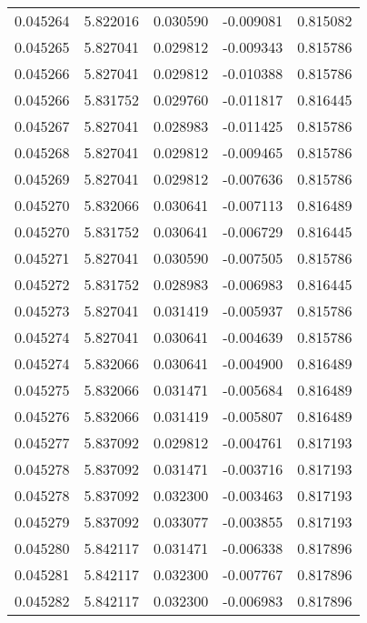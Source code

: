 \begin{tabular}{lrrrr}
0.045264    &  5.822016 &  0.030590 & -0.009081 &             0.815082 \\
0.045265    &  5.827041 &  0.029812 & -0.009343 &             0.815786 \\
0.045266    &  5.827041 &  0.029812 & -0.010388 &             0.815786 \\
0.045266    &  5.831752 &  0.029760 & -0.011817 &             0.816445 \\
0.045267    &  5.827041 &  0.028983 & -0.011425 &             0.815786 \\
0.045268    &  5.827041 &  0.029812 & -0.009465 &             0.815786 \\
0.045269    &  5.827041 &  0.029812 & -0.007636 &             0.815786 \\
0.045270    &  5.832066 &  0.030641 & -0.007113 &             0.816489 \\
0.045270    &  5.831752 &  0.030641 & -0.006729 &             0.816445 \\
0.045271    &  5.827041 &  0.030590 & -0.007505 &             0.815786 \\
0.045272    &  5.831752 &  0.028983 & -0.006983 &             0.816445 \\
0.045273    &  5.827041 &  0.031419 & -0.005937 &             0.815786 \\
0.045274    &  5.827041 &  0.030641 & -0.004639 &             0.815786 \\
0.045274    &  5.832066 &  0.030641 & -0.004900 &             0.816489 \\
0.045275    &  5.832066 &  0.031471 & -0.005684 &             0.816489 \\
0.045276    &  5.832066 &  0.031419 & -0.005807 &             0.816489 \\
0.045277    &  5.837092 &  0.029812 & -0.004761 &             0.817193 \\
0.045278    &  5.837092 &  0.031471 & -0.003716 &             0.817193 \\
0.045278    &  5.837092 &  0.032300 & -0.003463 &             0.817193 \\
0.045279    &  5.837092 &  0.033077 & -0.003855 &             0.817193 \\
0.045280    &  5.842117 &  0.031471 & -0.006338 &             0.817896 \\
0.045281    &  5.842117 &  0.032300 & -0.007767 &             0.817896 \\
0.045282    &  5.842117 &  0.032300 & -0.006983 &             0.817896 \\

\end{tabular}
